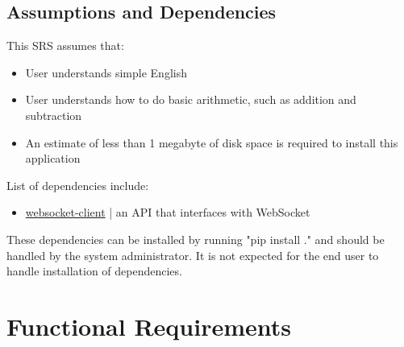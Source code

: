 \documentclass[12pt]{article}
\begin{document}
\subsection{Assumptions and Dependencies}

\begin{flushleft}

This SRS assumes that:

\begin{itemize}
\item User understands simple English
\item User understands how to do basic arithmetic, such as addition and subtraction
\item An estimate of less than 1 megabyte of disk space is required to install this application
\end{itemize}

List of dependencies include:

\begin{itemize}
\item \href{https://pypi.org/project/websocket_client/}{websocket-client} | an API that interfaces with WebSocket
\end{itemize}

These dependencies can be installed by running "pip install ." and should be handled by the system administrator.
It is not expected for the end user to handle installation of dependencies.

\end{flushleft}

\newpage

\section{Functional Requirements}
\end{document}
